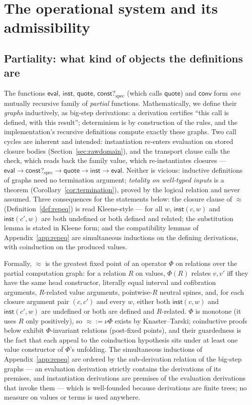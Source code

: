 \documentclass{lmcs}
\newcommand{\repeq}{\approx}
\newcommand{\evalop}{\mathsf{eval}}
\newcommand{\constspec}{\mathsf{const?}_{\mathrm{spec}}}
\newcommand{\convop}{\mathsf{conv}}
\newcommand{\quo}{\mathsf{quote}}
\newcommand{\capp}{\mathsf{inst}}
\begin{document}
\section{The operational system and its admissibility}
\label{sec:oper}

\subsection{Partiality: what kind of objects the definitions are}
\label{sec:partiality}

The functions $\evalop$, $\capp$, $\quo$, $\constspec$ (which calls
$\quo$) and $\convop$ form \emph{one} mutually recursive family of
\emph{partial} functions.  Mathematically, we define their
\emph{graphs} inductively, as big-step derivations: a derivation
certifies ``this call is defined, with this result''; determinism is
by construction of the rules, and the implementation's recursive
definitions compute exactly these graphs.  Two call cycles are
inherent and intended: instantiation re-enters evaluation on stored
closure bodies (Section~\ref{sec:rawdomain}), and the transport
clause calls the check, which reads back the family value, which
re-instantiates closures ---
$\evalop \to \constspec \to \quo \to \capp \to \evalop$.  Neither is
vicious: inductive definitions of graphs need no termination
argument; \emph{totality on well-typed inputs} is a theorem
(Corollary~\ref{cor:termination}), proved by the logical relation
and never assumed.  Three consequences for the statements below:
the closure clause of $\repeq$ (Definition~\ref{def:repeq}) is read
Kleene-style --- for all $w$, $\capp(c,w)$ and $\capp(c',w)$ are both
undefined or both defined and related; the substitution lemma is
stated in Kleene form; and the compatibility lemmas of
Appendix~\ref{app:repeq} are simultaneous inductions on the defining
derivations, with coinduction on the produced values.

Formally, $\repeq$ is the greatest fixed point of an operator
$\Phi$ on relations over the partial computation graph: for a
relation $R$ on values, $\Phi(R)$ relates $v, v'$ iff they have the
same head constructor, literally equal interval and cofibration
arguments, $R$-related value arguments, pointwise-$R$ neutral
spines, and, for each closure argument pair $(c, c')$ and every $w$,
either both $\capp(c,w)$ and $\capp(c',w)$ are undefined or both are
defined and $R$-related.  $\Phi$ is monotone (it uses $R$ only
positively), so $\repeq := \nu\Phi$ exists by Knaster--Tarski;
coinductive proofs below exhibit $\Phi$-invariant relations
(post-fixed points), and their guardedness is the fact that each
appeal to the coinduction hypothesis sits under at least one value
constructor of $\Phi$'s unfolding.  The simultaneous inductions of
Appendix~\ref{app:repeq} are ordered by the sub-derivation relation
of the big-step graphs --- an evaluation derivation strictly
contains the derivations of its premises, and instantiation
derivations are premises of the evaluation derivations that invoke
them --- which is well-founded because derivations are finite trees;
no measure on values or terms is used anywhere.
\end{document}
